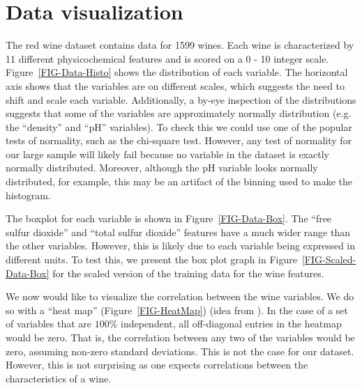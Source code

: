 \documentclass[12pt,preprint]{aastex61}
\begin{document}


\section{Data visualization \label{viz}}

The red wine dataset contains data for 1599 wines. Each wine is
characterized by 11 different physicochemical features and is scored
on a 0 - 10 integer scale.  Figure~\ref{FIG-Data-Histo} shows the
distribution of each variable. The horizontal axis shows that the
variables are on different scales, which suggests the need to shift
and scale each variable. Additionally, a by-eye inspection of the
distributions suggests that some of the variables are approximately
normally distribution (e.g.  the ``density'' and ``pH'' variables). To
check this we could use one of the popular tests of normality, such as
the chi-square test. However, any test of normality for our large
sample will likely fail because no variable in the dataset is exactly
normally distributed. Moreover, although the pH variable looks
normally distributed, for example, this may be an artifact of the
binning used to make the histogram.

The boxplot for each variable is shown in
Figure~\ref{FIG-Data-Box}. The ``free sulfur dioxide'' and ``total
sulfur dioxide'' features have a much wider range than the other
variables. However, this is likely due to each variable being
expressed in different units. To test this, we present the box plot
graph in Figure~\ref{FIG-Scaled-Data-Box} for the scaled version of
the training data for the wine features.

We now would like to visualize the correlation between the wine
variables. We do so with a ``heat map'' (Figure~\ref{FIG-HeatMap})
(idea from \citealp{Li_2017}).  In the case of a set of variables that
are $100\%$ independent, all off-diagonal entries in the heatmap would
be zero. That is, the correlation between any two of the variables
would be zero, assuming non-zero standard deviations. This is not the
case for our dataset.  However, this is not surprising as one expects
correlations between the characteristics of a wine.
\end{document}
